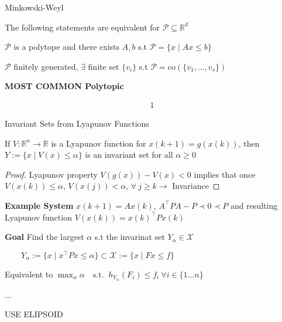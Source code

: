 \begin{theorem}{Minkowski-Weyl}

	The following statements are equivalent
	for $\mathcal{P}\subseteq \mathbb{R}^d$

	$\mathcal{P}$ is a polytope and there exists
	$A, b$ s.t $\mathcal{P} = \{x \mid Ax \leq b\}$

	$\mathcal{P}$ finitely generated,
	$\exists$ finite set $\{v_i\}$ s.t
	$\mathcal{P}=\text{co}(\{v_1,...,v_s\})$
\end{theorem}


\begin{sstTitleBox}[ForestGreen]{\textbf{\large
			MOST COMMON Polytopic
		}
	}


	\[\begin{aligned}
			1
		\end{aligned}\]

\end{sstTitleBox}

\begin{lemma}{Invariant Sets from Lyapunov Functions}

	If $V:\mathbb{R}^n \to \mathbb{R}$ is a Lyapunov function
	for $x(k+1) = g(x(k))$, then
	$Y := \{x \mid V(x) \leq \alpha\}$
	is an invariant set for all $\alpha \geq 0$
\end{lemma}

\begin{proof}
	Lyapunov property $V(g(x)) - V(x) < 0$
	implies that once $V(x(k))\leq \alpha$,
	$V(x(j))<\alpha$,
	$\forall\ j\ge k \rightarrow$ Invariance
\end{proof}

\textbf{Example System}
$x(k+1) = Ax(k)$, $A^\top P A - P \prec 0 \prec P$
and resulting  Lyapunov function
$V(x(k)) = x(k)^\top P x(k)$

\textbf{Goal} Find the largest $\alpha$ s.t the
invarinat set $Y_\alpha \in \mathcal{X}$

$\qquad Y_\alpha := \{x \mid x^\top P x \leq \alpha\}\subset \mathcal{X} := \{x \mid Fx\leq f\}$

Equivalent to $\max_\alpha \alpha \quad \text{s.t. }\
	h_{Y_\alpha}(F_i) \leq f_i \ \forall i \in \{1\dots n\}$

...

USE ELIPSOID
